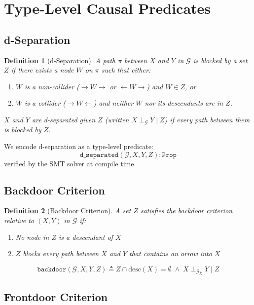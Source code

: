 \documentclass[11pt]{article}
\newtheorem{definition}{Definition}
\begin{document}
\section{Type-Level Causal Predicates}

\subsection{d-Separation}

\begin{definition}[d-Separation]
A path $\pi$ between $X$ and $Y$ in $\mathcal{G}$ is \emph{blocked} by a set $Z$ if there exists a node $W$ on $\pi$ such that either:
\begin{enumerate}
\item $W$ is a non-collider ($\to W \to$ or $\gets W \to$) and $W \in Z$, or
\item $W$ is a collider ($\to W \gets$) and neither $W$ nor its descendants are in $Z$.
\end{enumerate}
$X$ and $Y$ are \emph{d-separated} given $Z$ (written $X \perp_\mathcal{G} Y \mid Z$) if every path between them is blocked by $Z$.
\end{definition}

We encode d-separation as a type-level predicate:
\[
\texttt{d\_separated}(\mathcal{G}, X, Y, Z) : \texttt{Prop}
\]
verified by the SMT solver at compile time.

\subsection{Backdoor Criterion}

\begin{definition}[Backdoor Criterion]
A set $Z$ satisfies the backdoor criterion relative to $(X, Y)$ in $\mathcal{G}$ if:
\begin{enumerate}
\item No node in $Z$ is a descendant of $X$
\item $Z$ blocks every path between $X$ and $Y$ that contains an arrow into $X$
\end{enumerate}
\end{definition}

\[
\texttt{backdoor}(\mathcal{G}, X, Y, Z) \triangleq
Z \cap \text{desc}(X) = \emptyset \;\wedge\;
X \perp_{\mathcal{G}_{\overline{X}}} Y \mid Z
\]

\subsection{Frontdoor Criterion}
\end{document}
